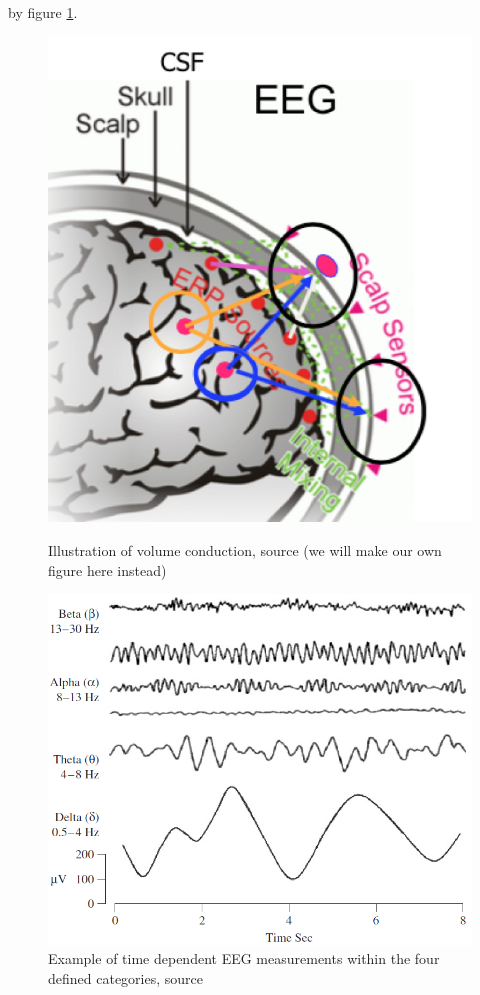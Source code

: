 by figure \ref{fig:EEG_example}.        
\begin{figure}[H]
    \begin{minipage}[t]{.45\textwidth}
        \centering
        \includegraphics[width=\textwidth]{figurs/scalp.png}
        \caption{Illustration of volume conduction, source \cite{phd2015}(we will make our own figure here instead)}\label{fig:volumeconduction}
    \end{minipage} 
    \hfill
    \begin{minipage}[t]{.45\textwidth}
        \centering
        \includegraphics[width=\textwidth]{figurs/EEG_example.png}
        \caption{Example of time dependent EEG measurements within the four defined categories, source \cite{EEGsignalprocessing}}\label{fig:EEG_example}
    \end{minipage}
\end{figure}
